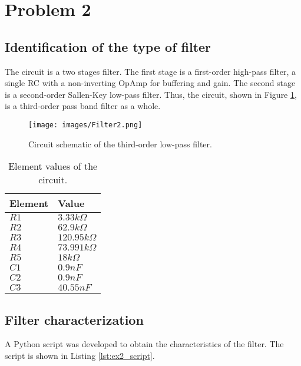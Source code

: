 \section{Problem 2}

\subsection{Identification of the type of filter}

The circuit is a two stages filter. The first stage is a first-order high-pass filter, a single RC with a non-inverting OpAmp for buffering and gain. The second stage is a second-order Sallen-Key low-pass filter. Thus, the circuit, shown in Figure \ref{fig:sch_ex2}, is a third-order pass band filter as a whole. 

\begin{figure}[H]
    \centering
    \texttt{[image: images/Filter2.png]}
    \caption{Circuit schematic of the third-order low-pass filter.}
    \label{fig:sch_ex2}
\end{figure}

\begin{table}[h]
    \centering
    \caption{Element values of the circuit.}
    \begin{tabularx}{\textwidth}{>{\centering\arraybackslash}X >{\centering\arraybackslash}X}
        \toprule
        \textbf{Element} & \textbf{Value}\\
        \midrule
        $R1$ & $3.33k\Omega$\\ \midrule
        $R2$ &  $62.9k\Omega$ \\ \midrule
        $R3$ & $120.95k\Omega$ \\ \midrule
        $R4$ &  $73.991k\Omega$\\ \midrule
        $R5$ &  $18k\Omega$\\ \midrule
        $C1$ & $0.9nF$ \\ \midrule
        $C2$ & $0.9nF$  \\ \midrule
        $C3$ & $40.55nF$ \\
        \bottomrule
    \end{tabularx}
    \label{tab:elements}
\end{table}

\subsection{Filter characterization}
A Python script was developed to obtain the characteristics of the filter. The script is shown in Listing \ref{lst:ex2_script}.

